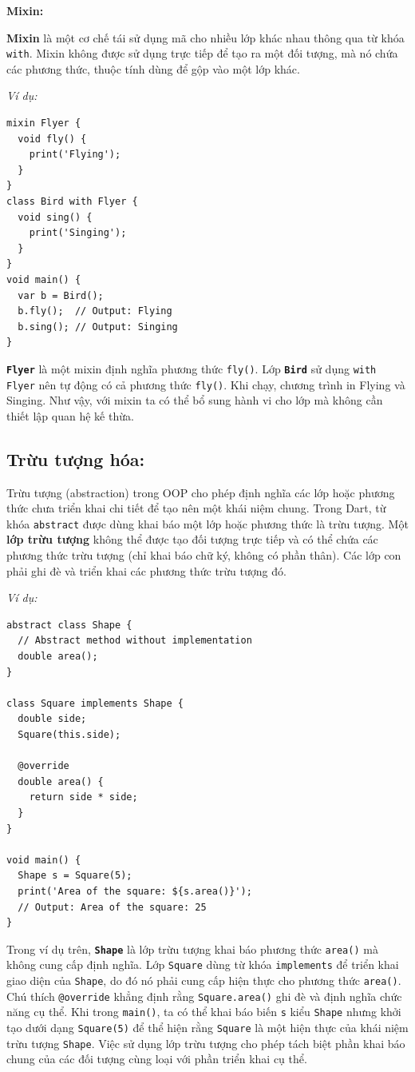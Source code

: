 \documentclass[../DoAn.tex]{subfiles}
\numberwithin{figure}{chapter}
\begin{document}
\textbf{Mixin:} 

\textbf{Mixin} là một cơ chế tái sử dụng mã cho nhiều lớp khác nhau thông qua từ khóa \texttt{with}. Mixin không được sử dụng trực tiếp để tạo ra một đối tượng, mà nó chứa các phương thức, thuộc tính dùng để gộp vào một lớp khác. 

\textit{Ví dụ:}
\begin{lstlisting}
mixin Flyer {
  void fly() {
    print('Flying');
  }
}
class Bird with Flyer {
  void sing() {
    print('Singing');
  }
}
void main() {
  var b = Bird();
  b.fly();  // Output: Flying
  b.sing(); // Output: Singing
}
\end{lstlisting}

\textbf{\texttt{Flyer}} là một mixin định nghĩa phương thức \texttt{fly()}. Lớp \textbf{\texttt{Bird}} sử dụng \texttt{with Flyer} nên tự động có cả phương thức \texttt{fly()}. Khi chạy, chương trình in Flying và Singing. Như vậy, với mixin ta có thể bổ sung hành vi cho lớp mà không cần thiết lập quan hệ kế thừa.

\subsection{Trừu tượng hóa:} 
Trừu tượng (abstraction) trong OOP cho phép định nghĩa các lớp hoặc phương thức chưa triển khai chi tiết để tạo nên một khái niệm chung. Trong Dart, từ khóa \texttt{abstract} được dùng khai báo một lớp hoặc phương thức là trừu tượng. Một \textbf{lớp trừu tượng} không thể được tạo đối tượng trực tiếp và có thể chứa các phương thức trừu tượng (chỉ khai báo chữ ký, không có phần thân). Các lớp con phải ghi đè và triển khai các phương thức trừu tượng đó. 

\textit{Ví dụ:}
\begin{lstlisting}
abstract class Shape {
  // Abstract method without implementation
  double area();
}

class Square implements Shape {
  double side;
  Square(this.side);

  @override
  double area() {
    return side * side;
  }
}

void main() {
  Shape s = Square(5);
  print('Area of the square: ${s.area()}');
  // Output: Area of the square: 25
}
\end{lstlisting}

Trong ví dụ trên, \textbf{\texttt{Shape}} là lớp trừu tượng khai báo phương thức \texttt{area()} mà không cung cấp định nghĩa. Lớp \texttt{Square} dùng từ khóa \texttt{implements} để triển khai giao diện của \texttt{Shape}, do đó nó phải cung cấp hiện thực cho phương thức \texttt{area()}. Chú thích \texttt{@override} khẳng định rằng \texttt{Square.area()} ghi đè và định nghĩa chức năng cụ thể. Khi trong \texttt{main()}, ta có thể khai báo biến \texttt{s} kiểu \texttt{Shape} nhưng khởi tạo dưới dạng \texttt{Square(5)} để thể hiện rằng \texttt{Square} là một hiện thực của khái niệm trừu tượng \texttt{Shape}. Việc sử dụng lớp trừu tượng cho phép tách biệt phần khai báo chung của các đối tượng cùng loại với phần triển khai cụ thể.
\end{document}
